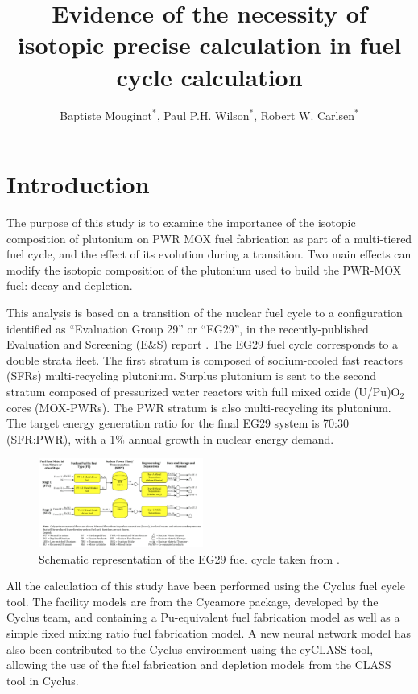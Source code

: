 \documentclass{anstrans}
\title{Evidence of the necessity of isotopic precise calculation in fuel cycle
calculation}
\author{ Baptiste Mouginot$^{*}$, Paul P.H. Wilson$^{*}$, Robert W. Carlsen$^{*}$ }
\institute{
$^{*}$University of Wisconsin-Madison, WI
}
\begin{document}
\section{Introduction} 

The purpose of this study is to examine the importance of the isotopic
composition of plutonium on PWR MOX fuel fabrication as part of a multi-tiered
fuel cycle, and the effect of its evolution during a transition. Two main
effects can modify the isotopic composition of the plutonium used to build the
PWR-MOX fuel: decay and depletion.

This analysis is based on a transition of the nuclear fuel cycle
to a configuration identified as ``Evaluation Group 29'' or ``EG29'', in the
recently-published Evaluation and Screening (E\&S) report \cite{ES}.  The EG29 fuel
cycle corresponds to a double strata fleet. The first stratum is composed of
sodium-cooled fast reactors (SFRs) multi-recycling plutonium. Surplus
plutonium is sent to the second stratum composed of pressurized water
reactors with full mixed oxide (U/Pu)O$_{2}$ cores (MOX-PWRs).  The PWR stratum
is also multi-recycling its plutonium. The target energy generation ratio for
the final EG29 system is 70:30 (SFR:PWR), with a 1\% annual growth in nuclear
energy demand.

\begin{figure}[ht] %
  \centering
  \includegraphics[width=0.48\textwidth]{FCDP_cycle}
  \caption{Schematic representation of the EG29 fuel cycle taken from \cite{FCDP}.}
  \label{fig:FCDP}
\end{figure}

All the calculation of this study have been performed using the Cyclus fuel cycle
tool\cite{CYCLUS}. The facility models are from the Cycamore package, developed by the
Cyclus team, and containing a Pu-equivalent fuel fabrication model as well as
a simple fixed mixing ratio fuel fabrication model. A new neural network model has
also been contributed to the Cyclus environment using the cyCLASS tool\cite{cyCLASS}, 
allowing the use of the fuel fabrication and depletion models from the CLASS tool
\cite{CLASS} in Cyclus.
\end{document}
